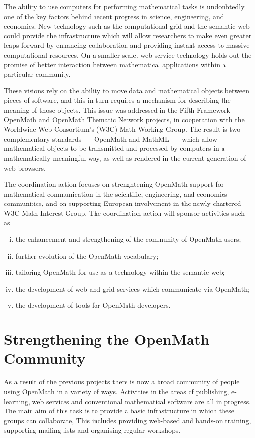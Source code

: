 \documentclass[draft]{artikel3}
\begin{document}
The ability to use computers for performing mathematical tasks is
undoubtedly one of the key factors behind recent progress in science,
engineering, and economics.  New technology such as the computational
grid and the semantic web could provide the infrastructure which will
allow researchers to make even greater leaps forward by enhancing
collaboration and providing instant access to massive computational
resources.  On a smaller scale, web service technology holds out the
promise of better interaction between mathematical applications within
a particular community.

These visions rely on the ability to move data and mathematical
objects between pieces of software, and this in turn requires a
mechanism for describing the meaning of those objects.  This issue was
addressed in the Fifth Framework OpenMath and OpenMath Thematic
Network projects, in cooperation with the Worldwide Web Consortium's
(W3C) Math Working Group.  The result is two complementary
standards~--- OpenMath and MathML~--- which allow mathematical objects
to be transmitted and processed by computers in a mathematically
meaningful way, as well as rendered in the current generation of web
browsers.

The coordination action focuses on strenghtening OpenMath support for
mathematical communication in the scientific, engineering, and
economics communities, and on supporting European involvement in the
newly-chartered W3C Math Interest Group.  The coordination action will
sponsor activities such as

\begin{enumerate}[(i)]
\item the enhancement and strengthening of the community of OpenMath
  users;
\item further evolution of the OpenMath vocabulary;
\item tailoring OpenMath for use as a technology within the semantic
  web;
\item the development of web and grid services which communicate via
  OpenMath;
\item the development of tools for OpenMath developers.
\end{enumerate}


\section{Strengthening the OpenMath Community} 
\label{community}


As a result of the previous projects there is now a broad community of
people using OpenMath in a variety of ways.  Activities in the areas
of publishing, e-learning, web services and conventional mathematical
software are all in progress.  The main aim of this task is to provide
a basic infrastructure in which these groups can collaborate, This
includes providing web-based and hands-on training, supporting mailing
lists and organising regular workshops.
\end{document}

